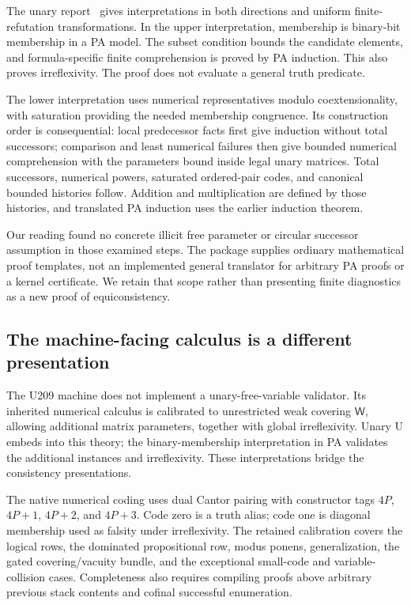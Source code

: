 \documentclass[11pt,letterpaper]{article}
\newcommand{\W}{\mathsf W}
\begin{document}
The unary report~\cite{unary} gives interpretations in both directions and
uniform finite-refutation transformations. In the upper interpretation,
membership is binary-bit membership in a PA model. The subset condition
bounds the candidate elements, and formula-specific finite comprehension
is proved by PA induction. This also proves irreflexivity. The proof does
not evaluate a general truth predicate.

The lower interpretation uses numerical representatives modulo
coextensionality, with saturation providing the needed membership
congruence. Its construction order is consequential: local predecessor
facts first give induction without total successors; comparison and least
numerical failures then give bounded numerical comprehension with the
parameters bound inside legal unary matrices. Total successors, numerical
powers, saturated ordered-pair codes, and canonical bounded histories
follow. Addition and multiplication are defined by those histories, and
translated PA induction uses the earlier induction theorem.

Our reading found no concrete illicit free parameter or circular successor
assumption in those examined steps. The package supplies ordinary
mathematical proof templates, not an implemented general translator for
arbitrary PA proofs or a kernel certificate. We retain that scope rather
than presenting finite diagnostics as a new proof of equiconsistency.

\subsection{The machine-facing calculus is a different presentation}

The U209 machine does not implement a unary-free-variable validator. Its
inherited numerical calculus is calibrated to unrestricted weak covering
$\W$, allowing additional matrix parameters, together with global
irreflexivity. Unary U embeds into this theory; the binary-membership
interpretation in PA validates the additional instances and irreflexivity.
These interpretations bridge the consistency presentations.

The native numerical coding uses dual Cantor pairing with constructor tags
$4P$, $4P+1$, $4P+2$, and $4P+3$. Code zero is a truth alias; code one is
diagonal membership used as falsity under irreflexivity. The retained
calibration covers the logical rows, the dominated propositional row,
modus ponens, generalization, the gated covering/vacuity bundle, and the
exceptional small-code and variable-collision cases. Completeness also
requires compiling proofs above arbitrary previous stack contents and
cofinal successful enumeration.
\end{document}
